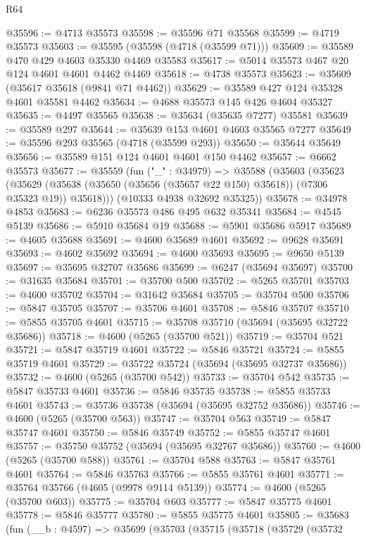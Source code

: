 \begin{lexlean}{R64}
\begin{coremodule}
@35596 := @4713 @35573
@35598 := @35596 @71 @35568
@35599 := @4719 @35573
@35603 := @35595 (@35598 (@4718 (@35599 @71)))
@35609 := @35589 @470 @429 @4603 @35330 @4469 @35583
@35617 := @5014 @35573 @467 @20 @124 @4601 @4601 @4462 @4469
@35618 := @4738 @35573
@35623 := @35609 (@35617 @35618 (@9841 @71 @4462))
@35629 := @35589 @427 @124 @35328 @4601 @35581 @4462
@35634 := @4688 @35573 @145 @426 @4604 @35327
@35635 := @4497 @35565
@35638 := @35634 (@35635 @7277) @35581
@35639 := @35589 @297
@35644 := @35639 @153 @4601 @4603 @35565 @7277
@35649 := @35596 @293 @35565 (@4718 (@35599 @293))
@35650 := @35644 @35649
@35656 := @35589 @151 @124 @4601 @4601 @150 @4462
@35657 := @6662 @35573
@35677 := @35559
    (fun ("_" : @34979) =>
    @35588
      (@35603
        (@35623
          (@35629 (@35638 (@35650 (@35656 (@35657 @22 @150) @35618)) (@7306 @35323 @19)) @35618)))
      (@10333 @4938 @32692 @35325))
@35678 := @34978 @4853
@35683 := @6236 @35573 @486 @495 @632 @35341
@35684 := @4545 @5139
@35686 := @5910 @35684 @19
@35688 := @5901 @35686 @5917
@35689 := @4605 @35688
@35691 := @4600 @35689 @4601
@35692 := @9628 @35691
@35693 := @4602 @35692
@35694 := @4600 @35693
@35695 := @9650 @5139
@35697 := @35695 @32707 @35686
@35699 := @6247 (@35694 @35697)
@35700 := @31635 @35684
@35701 := @35700 @500
@35702 := @5265 @35701
@35703 := @4600 @35702
@35704 := @31642 @35684
@35705 := @35704 @500
@35706 := @5847 @35705
@35707 := @35706 @4601
@35708 := @5846 @35707
@35710 := @5855 @35705 @4601
@35715 := @35708 @35710 (@35694 (@35695 @32722 @35686))
@35718 := @4600 (@5265 (@35700 @521))
@35719 := @35704 @521
@35721 := @5847 @35719 @4601
@35722 := @5846 @35721
@35724 := @5855 @35719 @4601
@35729 := @35722 @35724 (@35694 (@35695 @32737 @35686))
@35732 := @4600 (@5265 (@35700 @542))
@35733 := @35704 @542
@35735 := @5847 @35733 @4601
@35736 := @5846 @35735
@35738 := @5855 @35733 @4601
@35743 := @35736 @35738 (@35694 (@35695 @32752 @35686))
@35746 := @4600 (@5265 (@35700 @563))
@35747 := @35704 @563
@35749 := @5847 @35747 @4601
@35750 := @5846 @35749
@35752 := @5855 @35747 @4601
@35757 := @35750 @35752 (@35694 (@35695 @32767 @35686))
@35760 := @4600 (@5265 (@35700 @588))
@35761 := @35704 @588
@35763 := @5847 @35761 @4601
@35764 := @5846 @35763
@35766 := @5855 @35761 @4601
@35771 := @35764 @35766 (@4605 (@9978 @9114 @5139))
@35774 := @4600 (@5265 (@35700 @603))
@35775 := @35704 @603
@35777 := @5847 @35775 @4601
@35778 := @5846 @35777
@35780 := @5855 @35775 @4601
@35805 := @35683
    (fun (__b : @4597) =>
    @35699
      (@35703
        (@35715
          (@35718
            (@35729
              (@35732

\end{coremodule}
\end{lexlean}
